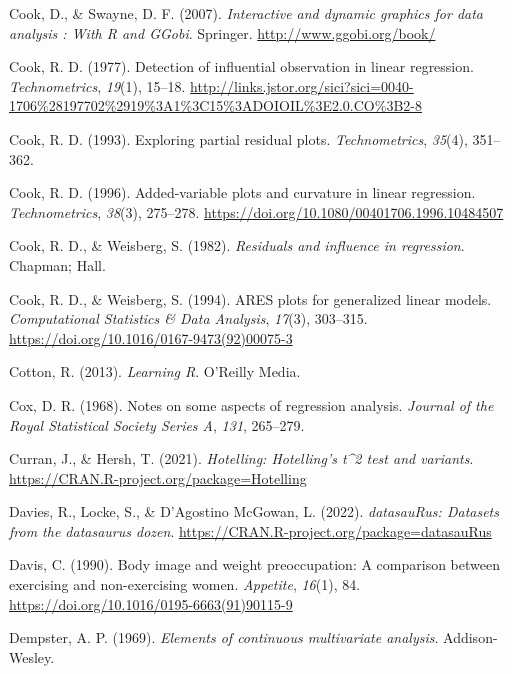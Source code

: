\documentclass[
  letterpaper,
  10pt,
  krantz2]{krantz}
\newlength{\cslhangindent}
\newenvironment{CSLReferences}[2] %
 {\begin{list}{}{%
  \setlength{\itemindent}{0pt}
  \setlength{\leftmargin}{0pt}
  \setlength{\parsep}{0pt}
  \ifodd #1
   \setlength{\leftmargin}{\cslhangindent}
   \setlength{\itemindent}{-1\cslhangindent}
  \fi
  \setlength{\itemsep}{#2\baselineskip}}}
 {\end{list}}
\begin{document}
\begin{CSLReferences}{1}{0}
Cook, D., \& Swayne, D. F. (2007). \emph{Interactive and dynamic
graphics for data analysis : With {R} and {GGobi}}. Springer.
\url{http://www.ggobi.org/book/}

Cook, R. D. (1977). Detection of influential observation in linear
regression. \emph{Technometrics}, \emph{19}(1), 15--18.
\url{http://links.jstor.org/sici?sici=0040-1706\%28197702\%2919\%3A1\%3C15\%3ADOIOIL\%3E2.0.CO\%3B2-8}

Cook, R. D. (1993). Exploring partial residual plots.
\emph{Technometrics}, \emph{35}(4), 351--362.

Cook, R. D. (1996). Added-variable plots and curvature in linear
regression. \emph{Technometrics}, \emph{38}(3), 275--278.
\url{https://doi.org/10.1080/00401706.1996.10484507}

Cook, R. D., \& Weisberg, S. (1982). \emph{Residuals and influence in
regression}. Chapman; Hall.

Cook, R. D., \& Weisberg, S. (1994). ARES plots for generalized linear
models. \emph{Computational Statistics \& Data Analysis}, \emph{17}(3),
303--315. \url{https://doi.org/10.1016/0167-9473(92)00075-3}

Cotton, R. (2013). \emph{{Learning R}}. O'Reilly Media.

Cox, D. R. (1968). Notes on some aspects of regression analysis.
\emph{Journal of the Royal Statistical Society Series A}, \emph{131},
265--279.

Curran, J., \& Hersh, T. (2021). \emph{Hotelling: Hotelling's t\^{}2
test and variants}. \url{https://CRAN.R-project.org/package=Hotelling}

Davies, R., Locke, S., \& D'Agostino McGowan, L. (2022).
\emph{datasauRus: Datasets from the datasaurus dozen}.
\url{https://CRAN.R-project.org/package=datasauRus}

Davis, C. (1990). Body image and weight preoccupation: A comparison
between exercising and non-exercising women. \emph{Appetite},
\emph{16}(1), 84. \url{https://doi.org/10.1016/0195-6663(91)90115-9}

Dempster, A. P. (1969). \emph{Elements of continuous multivariate
analysis}. Addison-Wesley.


\end{CSLReferences}
\end{document}
